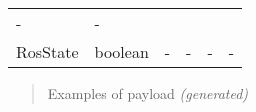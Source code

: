 \documentclass[
]{article}
\begin{document}
\begin{longtable}[]{@{}llllll@{}}
\begin{minipage}[t]{0.14\columnwidth}
-\strut
\end{minipage} & \begin{minipage}[t]{0.14\columnwidth}\raggedright
-\strut
\end{minipage}\tabularnewline
\begin{minipage}[t]{0.14\columnwidth}\raggedright
RosState\strut
\end{minipage} & \begin{minipage}[t]{0.14\columnwidth}\raggedright
boolean\strut
\end{minipage} & \begin{minipage}[t]{0.14\columnwidth}\raggedright
-\strut
\end{minipage} & \begin{minipage}[t]{0.14\columnwidth}\raggedright
-\strut
\end{minipage} & \begin{minipage}[t]{0.14\columnwidth}\raggedright
-\strut
\end{minipage} & \begin{minipage}[t]{0.14\columnwidth}\raggedright
-\strut
\end{minipage}\tabularnewline
\bottomrule
\end{longtable}

\begin{quote}
Examples of payload \emph{(generated)}
\end{quote}
\end{document}
